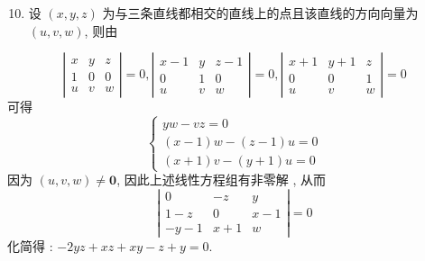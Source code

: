 \documentclass[10pt]{article}
\begin{document}
\begin{enumerate}
  \setcounter{enumi}{9}
  \item  设  $(x, y, z)$  为与三条直线都相交的直线上的点且该直线的方向向量为  $(u, v, w)$,  则由 
\end{enumerate}
$$
\left|\begin{array}{ccc}
x & y & z \\
1 & 0 & 0 \\
u & v & w
\end{array}\right|=0,\left|\begin{array}{ccc}
x-1 & y & z-1 \\
0 & 1 & 0 \\
u & v & w
\end{array}\right|=0,\left|\begin{array}{ccc}
x+1 & y+1 & z \\
0 & 0 & 1 \\
u & v & w
\end{array}\right|=0
$$
 可得 
$$
\left\{\begin{array}{r}
y w-v z=0 \\
(x-1) w-(z-1) u=0 \\
(x+1) v-(y+1) u=0
\end{array}\right.
$$
 因为  $(u, v, w) \neq \mathbf{0}$,  因此上述线性方程组有非零解 ,  从而 
$$
\left|\begin{array}{ccc}
0 & -z & y \\
1-z & 0 & x-1 \\
-y-1 & x+1 & w
\end{array}\right|=0
$$
 化简得 : $-2 y z+x z+x y-z+y=0$.
\end{document}
